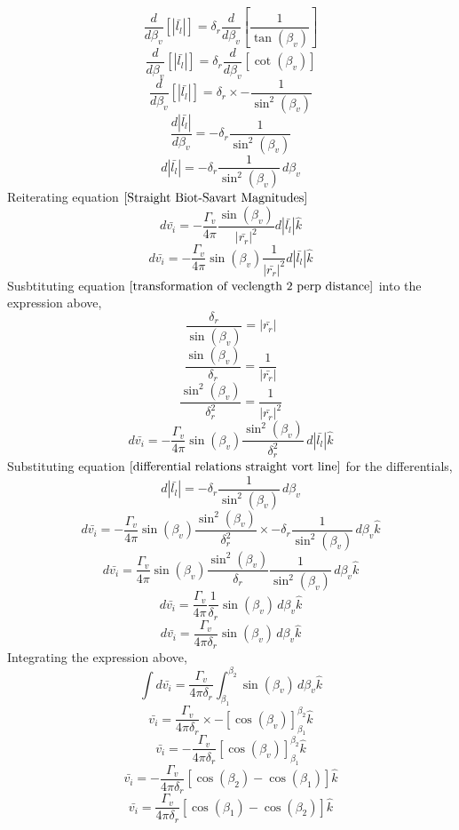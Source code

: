 \documentclass[a4paper, 12pt]{report}
\begin{document}
\begin{center}
$$\frac{d}{d \beta_{v}}\left[|\bar{l_{l}}|\right] = \delta_{r}\frac{d}{d \beta_{v}}\left[\frac{1}{\tan(\beta_{v})}\right]$$
$$\frac{d}{d \beta_{v}}\left[|\bar{l_{l}}|\right] = \delta_{r}\frac{d}{d \beta_{v}}\left[\cot(\beta_{v})\right]$$
$$\frac{d}{d \beta_{v}}\left[|\bar{l_{l}}|\right] = \delta_{r}\times -\frac{1}{\sin^{2}(\beta_{v})}$$
$$\frac{d|\bar{l_{l}}|}{d\beta_{v}} = -\delta_{r}\frac{1}{\sin^{2}(\beta_{v})}$$
\begin{equation}
d|\bar{l_{l}}| = -\delta_{r}\frac{1}{\sin^{2}(\beta_{v})}\,d\beta_{v}
\label{differential relations straight vort line}
\end{equation}
Reiterating equation $\ref{Straight Biot-Savart Magnitudes}$
$$d\bar{v_{i}} = -\frac{\Gamma_{v}}{4\pi}\frac{\sin(\beta_{v})}{|\bar{r_{r}}|^{2}}d|\bar{l_{l}}|\hat{k}$$
$$d\bar{v_{i}} = -\frac{\Gamma_{v}}{4\pi}\sin(\beta_{v})\frac{1}{|\bar{r_{r}}|^{2}}d|\bar{l_{l}}|\hat{k}$$
Susbtituting equation $\ref{transformation of veclength 2 perp distance}$ into the expression above,
$$\frac{\delta_{r}}{\sin(\beta_{v})} = |\bar{r_{r}}|$$
$$\frac{\sin(\beta_{v})}{\delta_{r}} = \frac{1}{|\bar{r_{r}}|}$$
$$\frac{\sin^{2}(\beta_{v})}{\delta_{r}^{2}} = \frac{1}{|\bar{r_{r}}|^{2}}$$
$$d\bar{v_{i}} = -\frac{\Gamma_{v}}{4\pi}\sin(\beta_{v})\frac{\sin^{2}(\beta_{v})}{\delta_{r}^{2}}\, d|\bar{l_{l}}|\hat{k}$$
Substituting equation $\ref{differential relations straight vort line}$ for the differentials,
$$d|\bar{l_{l}}| = -\delta_{r}\frac{1}{\sin^{2}(\beta_{v})}\,d\beta_{v}$$
$$d\bar{v_{i}} = -\frac{\Gamma_{v}}{4\pi}\sin(\beta_{v})\frac{\sin^{2}(\beta_{v})}{\delta_{r}^{2}}\times -\delta_{r}\frac{1}{\sin^{2}(\beta_{v})}\,d\beta_{v}\hat{k}$$
$$d\bar{v_{i}} = \frac{\Gamma_{v}}{4\pi}\sin(\beta_{v})\frac{\sin^{2}(\beta_{v})}{\delta_{r}}\frac{1}{\sin^{2}(\beta_{v})}\,d\beta_{v}\hat{k}$$
$$d\bar{v_{i}} = \frac{\Gamma_{v}}{4\pi}\frac{1}{\delta_{r}}\sin(\beta_{v})\, d\beta_{v}\hat{k}$$
$$d\bar{v_{i}} = \frac{\Gamma_{v}}{4\pi\delta_{r}}\sin(\beta_{v})\, d\beta_{v}\hat{k}$$
Integrating the expression above,
$$\int d\bar{v_{i}} = \frac{\Gamma_{v}}{4\pi\delta_{r}}\int^{\beta_{2}}_{\beta_{1}} \sin(\beta_{v})\, d\beta_{v}\hat{k}$$
$$\bar{v_{i}} = \frac{\Gamma_{v}}{4\pi\delta_{r}} \times -\left[\cos(\beta_{v})\right]^{\beta_{2}}_{\beta_{1}}\hat{k}$$
$$\bar{v_{i}} = -\frac{\Gamma_{v}}{4\pi\delta_{r}}\left[\cos(\beta_{v})\right]^{\beta_{2}}_{\beta_{1}}\hat{k}$$
$$\bar{v_{i}} = -\frac{\Gamma_{v}}{4\pi\delta_{r}}\left[\cos(\beta_{2}) - \cos(\beta_{1})\right]\hat{k}$$
\begin{equation}
\bar{v_{i}} = \frac{\Gamma_{v}}{4\pi\delta_{r}}\left[\cos(\beta_{1}) - \cos(\beta_{2})\right]\hat{k}
\label{Induced Velocity Straight Vortex Line Unspecified}
\end{equation}






\end{center}
\end{document}
